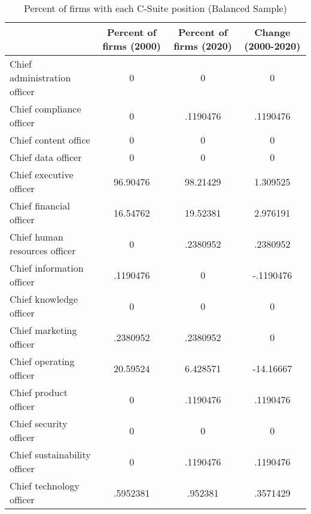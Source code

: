 \begin{table}[htbp]\centering
\caption{Percent of firms with each C-Suite position (Balanced Sample)\label{tab98}}
\begin{tabular}{l*{3}{c}}
\toprule
                    &Percent of firms (2000)&Percent of firms (2020)&Change (2000-2020)\\
\midrule
Chief administration officer&           0&           0&           0\\
Chief compliance officer&           0&    .1190476&    .1190476\\
Chief content office&           0&           0&           0\\
Chief data officer  &           0&           0&           0\\
Chief executive officer&    96.90476&    98.21429&    1.309525\\
Chief financial officer&    16.54762&    19.52381&    2.976191\\
Chief human resources officer&           0&    .2380952&    .2380952\\
Chief information officer&    .1190476&           0&   -.1190476\\
Chief knowledge officer&           0&           0&           0\\
Chief marketing officer&    .2380952&    .2380952&           0\\
Chief operating officer&    20.59524&    6.428571&   -14.16667\\
Chief product officer&           0&    .1190476&    .1190476\\
Chief security officer&           0&           0&           0\\
Chief sustainability officer&           0&    .1190476&    .1190476\\
Chief technology officer&    .5952381&     .952381&    .3571429\\
\bottomrule
\end{tabular}
\end{table}
